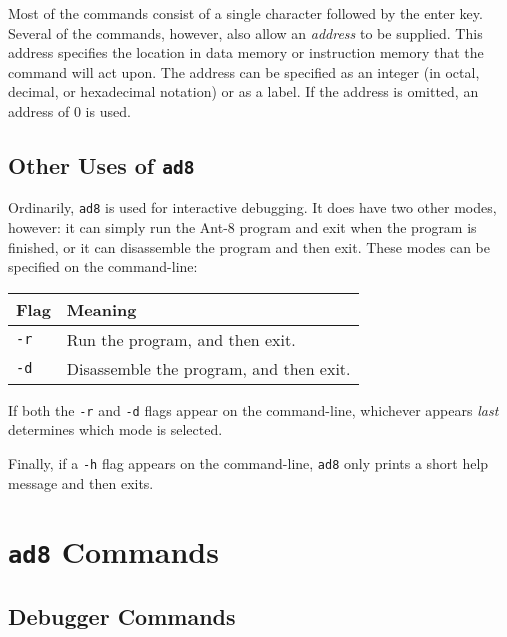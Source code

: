 Most of the commands consist of a single character 
followed by the enter key.  Several of the commands, however, also
allow an {\em address} to be supplied.  This address specifies
the location in data memory or instruction memory that the command
will act upon.  The address can be specified as an integer (in
octal, decimal, or hexadecimal notation) or as a label.  If the
address is omitted, an address of 0 is used.

\subsection{Other Uses of {\tt ad8}}

Ordinarily, {\tt ad8} is used for interactive debugging.  It does
have two other modes, however: it can simply run the Ant-8 program and exit
when the program is finished, or it can disassemble the program and then
exit.  These modes can be specified on the command-line:

\begin{center}
\begin{tabular}{|l|l|}
\hline
{\bf Flag} & {\bf Meaning} \\
\hline
\hline
{\tt -r} & Run the program, and then exit. \\
{\tt -d} & Disassemble the program, and then exit. \\
\hline
\end{tabular}
\end{center}

If both the {\tt -r} and {\tt -d} flags appear on the
command-line, whichever appears {\em last} determines which mode is
selected.

Finally, if a {\tt -h} flag appears on the command-line, {\tt ad8}
only prints a short help message and then exits. 

\section{ {\tt ad8} Commands}

\subsection{Debugger Commands}

